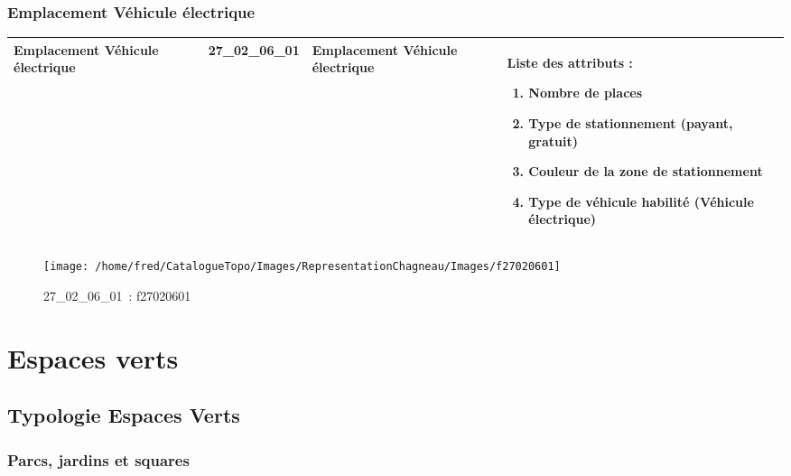 \documentclass[12pt,titlepage]{book}
\begin{document}
\subsection{Emplacement Véhicule électrique}
\noindent
\vspace{\baselineskip}

\renewcommand{\arraystretch}{1.2}
\begin{supertabular}{|p{10cm}|c|p{13cm}|p{12cm}|}
 Emplacement Véhicule électrique & 27\_02\_06\_01 & Emplacement Véhicule électrique & Liste des attributs :
\begin{enumerate}
  \item Nombre de places  \item Type de stationnement (payant, gratuit)  \item Couleur de la zone de stationnement  \item Type de véhicule habilité (Véhicule électrique)\end{enumerate}
\\
\hline
\end{supertabular}
\begin{figure}[h!]
  \hfill         %
  \begin{minipage}[t]{3cm}
    \begin{center}
      \texttt{[image: /home/fred/CatalogueTopo/Images/RepresentationChagneau/Images/f27020601]}
      \caption[~27\_02\_06\_01]{\small{27\_02\_06\_01~:} \tiny{f27020601}}\label{f27020601}
    \end{center}
  \end{minipage}
\end{figure}
\chapter{Espaces verts}
\section{\large Typologie Espaces Verts}
\subsection{Parcs, jardins et squares}
\noindent
\vspace{\baselineskip}
\end{document}
